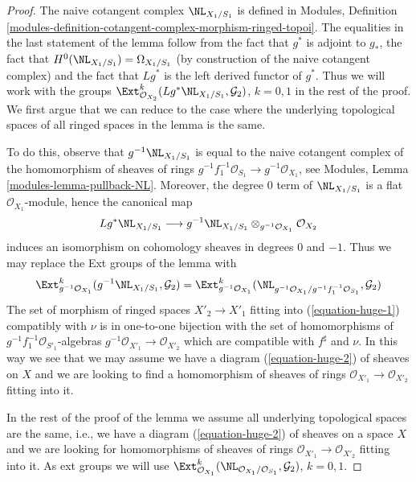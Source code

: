 \begin{proof}
The naive cotangent complex $\NL_{X_1/S_1}$ is defined in Modules, Definition
\ref{modules-definition-cotangent-complex-morphism-ringed-topoi}.
The equalities in the last statement of the lemma follow from
the fact that $g^*$ is adjoint to $g_*$, the fact that
$H^0(\NL_{X_1/S_1}) = \Omega_{X_1/S_1}$ (by construction of the
naive cotangent complex) and the fact that $Lg^*$ is the left
derived functor of $g^*$. Thus we will work with the groups
$\Ext^k_{\mathcal{O}_{X_2}}(Lg^*\NL_{X_1/S_1}, \mathcal{G}_2)$,
$k = 0, 1$ in the rest of the proof. We first argue that we can reduce
to the case where the underlying topological spaces of all ringed
spaces in the lemma is the same.

\medskip\noindent
To do this, observe that $g^{-1}\NL_{X_1/S_1}$ is equal to the naive
cotangent complex of the homomorphism of sheaves of rings
$g^{-1}f_1^{-1}\mathcal{O}_{S_1} \to g^{-1}\mathcal{O}_{X_1}$, see
Modules, Lemma \ref{modules-lemma-pullback-NL}.
Moreover, the degree $0$ term of $\NL_{X_1/S_1}$ is a flat
$\mathcal{O}_{X_1}$-module, hence the canonical map
$$
Lg^*\NL_{X_1/S_1}
\longrightarrow
g^{-1}\NL_{X_1/S_1} \otimes_{g^{-1}\mathcal{O}_{X_1}} \mathcal{O}_{X_2}
$$
induces an isomorphism on cohomology sheaves in degrees $0$ and $-1$.
Thus we may replace the Ext groups of the lemma with
$$
\Ext^k_{g^{-1}\mathcal{O}_{X_1}}(g^{-1}\NL_{X_1/S_1}, \mathcal{G}_2) =
\Ext^k_{g^{-1}\mathcal{O}_{X_1}}(
\NL_{g^{-1}\mathcal{O}_{X_1}/g^{-1}f_1^{-1}\mathcal{O}_{S_1}}, \mathcal{G}_2)
$$
The set of morphism of ringed spaces $X'_2 \to X'_1$ fitting into
(\ref{equation-huge-1}) compatibly with $\nu$
is in one-to-one bijection with
the set of homomorphisms of $g^{-1}f_1^{-1}\mathcal{O}_{S'_1}$-algebras
$g^{-1}\mathcal{O}_{X'_1} \to \mathcal{O}_{X'_2}$ which are compatible with
$f^\sharp$ and $\nu$. In this way we see that we may assume we have a
diagram (\ref{equation-huge-2}) of sheaves on $X$ and we are looking to
find a homomorphism of sheaves of rings
$\mathcal{O}_{X'_1} \to \mathcal{O}_{X'_2}$ fitting into it.

\medskip\noindent
In the rest of the proof of the lemma we assume
all underlying topological spaces are the
same, i.e., we have a diagram (\ref{equation-huge-2}) of sheaves on
a space $X$ and we are looking for homomorphisms of sheaves of rings
$\mathcal{O}_{X'_1} \to \mathcal{O}_{X'_2}$ fitting into it.
As ext groups we will use
$\Ext^k_{\mathcal{O}_{X_1}}(
\NL_{\mathcal{O}_{X_1}/\mathcal{O}_{S_1}}, \mathcal{G}_2)$, $k = 0, 1$.


\end{proof}
